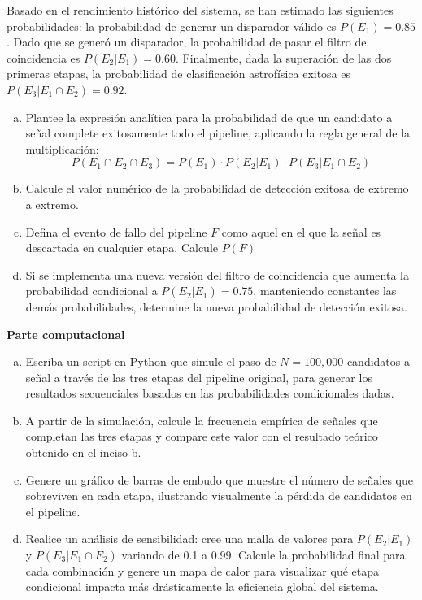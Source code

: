 \documentclass[a4paper]{article}
\begin{document}
Basado en el rendimiento histórico del sistema, se han estimado las siguientes probabilidades: la probabilidad de generar un disparador válido es $P(E_1) = 0.85$. Dado que se generó un disparador, la probabilidad de pasar el filtro de coincidencia es $P(E_2 | E_1) = 0.60$. Finalmente, dada la superación de las dos primeras etapas, la probabilidad de clasificación astrofísica exitosa es $P(E_3 | E_1 \cap E_2) = 0.92$.

\begin{enumerate}[a)]
\item Plantee la expresión analítica para la probabilidad de que un candidato a señal complete exitosamente todo el pipeline, aplicando la regla general de la multiplicación:
$$
P(E_1 \cap E_2 \cap E_3) = P(E_1) \cdot P(E_2 | E_1) \cdot P(E_3 | E_1 \cap E_2)
$$
\item Calcule el valor numérico de la probabilidad de detección exitosa de extremo a extremo.
\item Defina el evento de fallo del pipeline $F$ como aquel en el que la señal es descartada en cualquier etapa. Calcule $P(F)$
\item Si se implementa una nueva versión del filtro de coincidencia que aumenta la probabilidad condicional a $P(E_2 | E_1) = 0.75$, manteniendo constantes las demás probabilidades, determine la nueva probabilidad de detección exitosa.
\end{enumerate}

\textbf{Parte computacional}
\begin{enumerate}[a)]
\item Escriba un script en Python que simule el paso de $N = 100,000$ candidatos a señal a través de las tres etapas del pipeline original, para generar los resultados secuenciales basados en las probabilidades condicionales dadas.
\item A partir de la simulación, calcule la frecuencia empírica de señales que completan las tres etapas y compare este valor con el resultado teórico obtenido en el inciso b.
\item Genere un gráfico de barras de embudo que muestre el número de señales que sobreviven en cada etapa, ilustrando visualmente la pérdida de candidatos en el pipeline.
\item Realice un análisis de sensibilidad: cree una malla de valores para $P(E_2 | E_1)$ y $P(E_3 | E_1 \cap E_2)$ variando de 0.1 a 0.99. Calcule la probabilidad final para cada combinación y genere un mapa de calor  para visualizar qué etapa condicional impacta más drásticamente la eficiencia global del sistema.
\end{enumerate}
\end{document}
